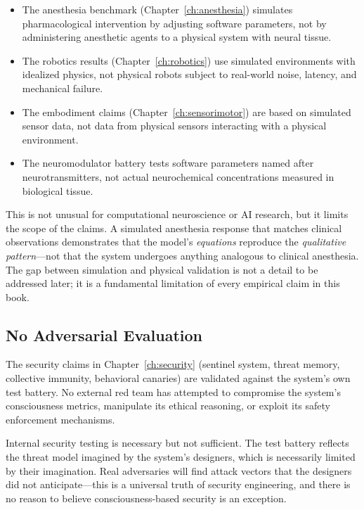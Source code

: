 \documentclass[12pt]{book}
\begin{document}
\begin{itemize}
  \item The anesthesia benchmark (Chapter~\ref{ch:anesthesia}) simulates pharmacological intervention by adjusting software parameters, not by administering anesthetic agents to a physical system with neural tissue.
  \item The robotics results (Chapter~\ref{ch:robotics}) use simulated environments with idealized physics, not physical robots subject to real-world noise, latency, and mechanical failure.
  \item The embodiment claims (Chapter~\ref{ch:sensorimotor}) are based on simulated sensor data, not data from physical sensors interacting with a physical environment.
  \item The neuromodulator battery tests software parameters named after neurotransmitters, not actual neurochemical concentrations measured in biological tissue.
\end{itemize}

This is not unusual for computational neuroscience or AI research, but it limits the scope of the claims. A simulated anesthesia response that matches clinical observations demonstrates that the model's \textit{equations} reproduce the \textit{qualitative pattern}---not that the system undergoes anything analogous to clinical anesthesia. The gap between simulation and physical validation is not a detail to be addressed later; it is a fundamental limitation of every empirical claim in this book.

\subsection{No Adversarial Evaluation}

The security claims in Chapter~\ref{ch:security} (sentinel system, threat memory, collective immunity, behavioral canaries) are validated against the system's own test battery. No external red team has attempted to compromise the system's consciousness metrics, manipulate its ethical reasoning, or exploit its safety enforcement mechanisms.

Internal security testing is necessary but not sufficient. The test battery reflects the threat model imagined by the system's designers, which is necessarily limited by their imagination. Real adversaries will find attack vectors that the designers did not anticipate---this is a universal truth of security engineering, and there is no reason to believe consciousness-based security is an exception.
\end{document}
